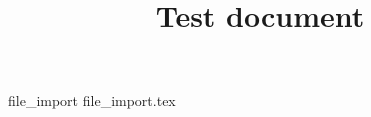 \documentclass[]{memoir}
\title{Test document}
\begin{document}
\maketitle




{file_import}
{file_import.tex}
\end{document}
